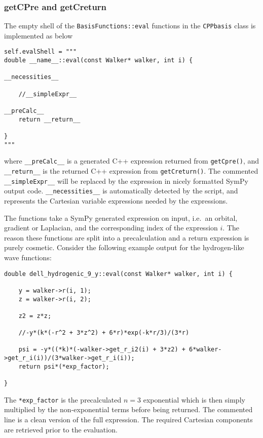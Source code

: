 \subsubsection{getCPre and getCreturn}

The empty shell of the \verb+BasisFunctions::eval+ functions in the \verb+CPPbasis+ class is implemented as below

\vspace{0.5cm}
\begin{lstlisting}[otherkeywords={self}]
self.evalShell = """
double __name__::eval(const Walker* walker, int i) {

__necessities__
    
    //__simpleExpr__
    
__preCalc__
    return __return__
    
}
"""
\end{lstlisting}

where \verb+__preCalc__+ is a generated C++ expression returned from \verb+getCpre()+, and \verb+__return__+ is the returned C++ expression from \verb+getCreturn()+. The commented \verb+__simpleExpr__+ will be replaced by the expression in nicely formatted SymPy output code. \verb+__necessities__+ is automatically detected by the script, and represents the Cartesian variable expressions needed by the expressions.

The functions take a SymPy generated expression on input, i.e.~an orbital, gradient or Laplacian, and the corresponding index of the expression $i$. The reason these functions are split into a precalculation and a return expression is purely cosmetic. Consider the following example output for the hydrogen-like wave functions:

\vspace{0.5cm}
\begin{lstlisting}
double dell_hydrogenic_9_y::eval(const Walker* walker, int i) {

    y = walker->r(i, 1);
    z = walker->r(i, 2);

    z2 = z*z;
    
    //-y*(k*(-r^2 + 3*z^2) + 6*r)*exp(-k*r/3)/(3*r)
    
    psi = -y*((*k)*(-walker->get_r_i2(i) + 3*z2) + 6*walker->get_r_i(i))/(3*walker->get_r_i(i));
    return psi*(*exp_factor);
    
}
\end{lstlisting}

The \verb+*exp_factor+ is the precalculated $n=3$ exponential which is then simply multiplied by the non-exponential terms before being returned. The commented line is a clean version of the full expression. The required Cartesian components are retrieved prior to the evaluation.

